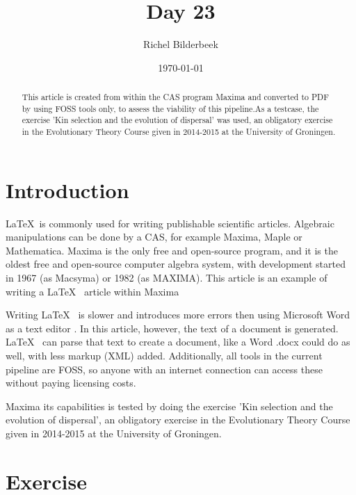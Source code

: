 \documentclass{article}
\title{Day 23}
\author{Richel Bilderbeek}
\date{\today}
\begin{document}
\maketitle

\begin{abstract}
This article is created from within the CAS program Maxima
and converted to PDF by using FOSS tools only, to assess the viability of this pipeline.As a testcase, the exercise 'Kin selection and the evolution of dispersal' was used,
an obligatory exercise in the Evolutionary Theory Course given in 2014-2015 at the
University of Groningen.
\end{abstract}

\section{Introduction}

\LaTeX~is commonly used for writing publishable scientific articles\cite{gaudeul2006}.
Algebraic manipulations can be done by a CAS, for example Maxima, Maple or Mathematica.
Maxima is the only free and open-source program, and it is the oldest free and open-source computer algebra system, with development started in 1967 (as Macsyma) or 1982 (as MAXIMA).
This article is an example of writing a \LaTeX~ article within Maxima

Writing \LaTeX~ is slower and introduces more errors 
then using Microsoft Word as a text editor \cite{knauff&nejasmic2014}.
In this article, however, the text of a document is generated. \LaTeX~ can
parse that text to create a document, like a Word .docx could do as well,
with less markup (XML) added. Additionally, all tools in the current pipeline
are FOSS, so anyone with an internet connection can access these without
paying licensing costs.

Maxima its capabilities is tested by doing the exercise 'Kin selection and the evolution of dispersal',
an obligatory exercise in the Evolutionary Theory Course given in 2014-2015 at the
University of Groningen.

\section{Exercise}
\end{document}
